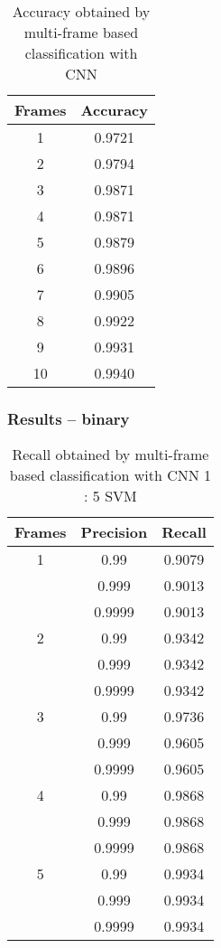     \begin{table}[H]
      \begin{center}
      \small
      \caption{Accuracy obtained by multi-frame based classification with CNN}
      \begin{tabular}{ |c|c| }
      \hline
      Frames & Accuracy\\
      \hline
      1 & 0.9721\\
      \hline
      2 & 0.9794\\
      \hline
      3 & 0.9871\\
      \hline
      4 & 0.9871\\
      \hline
      5 & 0.9879\\
      \hline
      6 & 0.9896\\
      \hline
      7 & 0.9905\\
      \hline
      8 & 0.9922\\
      \hline
      9 & 0.9931\\
      \hline
      10 & 0.9940\\
      \hline
      \end{tabular}
      \end{center}
    \end{table}

    \subsubsection{Results -- binary}
    \begin{table}[H]
    \begin{center}
    \small
    \caption{Recall obtained by multi-frame based classification with CNN 1 : 5 SVM}
    \begin{tabular}{ |c|c|c| }
        \hline
        Frames & Precision & Recall\\
    \hline
    1 & 0.99 & 0.9079\\
    & 0.999 & 0.9013\\
    & 0.9999 & 0.9013\\
    \hline
    2 & 0.99 & 0.9342\\
    & 0.999 & 0.9342\\
    & 0.9999 & 0.9342\\
    \hline
    3 & 0.99 & 0.9736\\
    & 0.999 & 0.9605\\
    & 0.9999 & 0.9605\\
    \hline
    4 & 0.99 & 0.9868\\
    & 0.999 & 0.9868\\
    & 0.9999 & 0.9868\\
    \hline
    5 & 0.99 & 0.9934\\
    & 0.999 & 0.9934\\
    & 0.9999 & 0.9934\\
    \hline

    \end{tabular}
    \end{center}
    \end{table}

